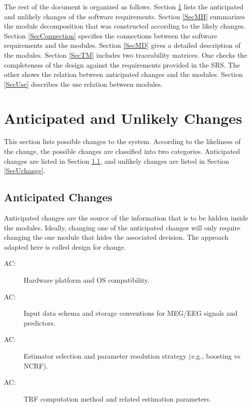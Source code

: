 \documentclass[12pt, titlepage]{article}
\newcounter{acnum}
\newcommand{\actheacnum}{AC\theacnum}
\begin{document}
The rest of the document is organized as follows. Section
\ref{SecChange} lists the anticipated and unlikely changes of the software
requirements. Section \ref{SecMH} summarizes the module decomposition that
was constructed according to the likely changes. Section \ref{SecConnection}
specifies the connections between the software requirements and the
modules. Section \ref{SecMD} gives a detailed description of the
modules. Section \ref{SecTM} includes two traceability matrices. One checks
the completeness of the design against the requirements provided in the SRS. The
other shows the relation between anticipated changes and the modules. Section
\ref{SecUse} describes the use relation between modules.

\section{Anticipated and Unlikely Changes} \label{SecChange}

This section lists possible changes to the system. According to the likeliness
of the change, the possible changes are classified into two
categories. Anticipated changes are listed in Section \ref{SecAchange}, and
unlikely changes are listed in Section \ref{SecUchange}.

\subsection{Anticipated Changes} \label{SecAchange}

Anticipated changes are the source of the information that is to be hidden
inside the modules. Ideally, changing one of the anticipated changes will only
require changing the one module that hides the associated decision. The approach
adapted here is called design for
change.

\begin{description}
\item[ \actheacnum \label{acHardware}:] Hardware platform and OS compatibility.
\item[ \actheacnum \label{acInput}:] Input data schema and storage conventions for MEG/EEG signals and predictors.
\item[ \actheacnum \label{acEstimator}:] Estimator selection and parameter resolution strategy (e.g., boosting vs NCRF).
\item[ \actheacnum \label{acTRF}:] TRF computation method and related estimation parameters.
\end{description}
\end{document}
